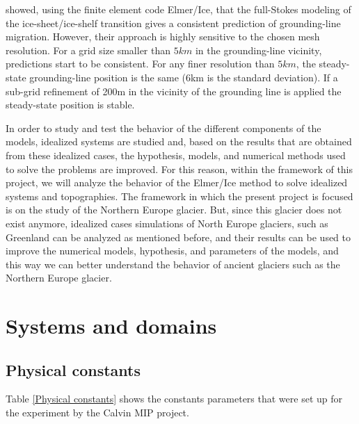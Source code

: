 \documentclass{article}
\begin{document}
\cite{durand2009full} showed, using the finite element code Elmer/Ice, that the full-Stokes modeling of the ice-sheet/ice-shelf transition gives a consistent prediction of grounding-line migration. However, their approach is highly sensitive to the chosen mesh resolution. For a grid size smaller than $5 km$ in the grounding-line vicinity, predictions start to be consistent. For any finer resolution than $5 km$, the steady-state grounding-line position is the same (6km is the standard deviation). If a sub-grid refinement of 200m in the vicinity of the grounding line is applied the steady-state position is stable.

In order to study and test the behavior of the different components of the models, idealized systems are studied and, based on the results that are obtained from these idealized cases, the hypothesis, models, and numerical methods used to solve the problems are improved. For this reason, within the framework of this project, we will analyze the behavior of the Elmer/Ice method to solve idealized systems and topographies. The framework in which the present project is focused is on the study of the Northern Europe glacier. But, since this glacier does not exist anymore, idealized cases simulations of North Europe glaciers, such as Greenland can be analyzed as mentioned before, and their results can be used to improve the numerical models, hypothesis, and parameters of the models, and this way we can better understand the behavior of ancient glaciers such as the Northern Europe glacier.

\section{Systems and domains}

\subsection{Physical constants}
Table \ref{Physical constants} shows the constants parameters that were set up for the experiment by the Calvin MIP project. 
\end{document}
